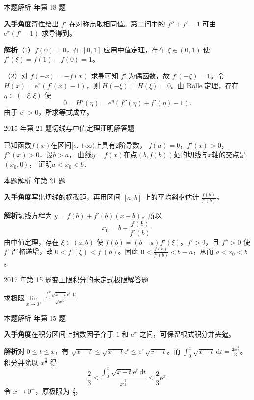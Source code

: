 \documentclass[UTF8,zihao=-4,fontset=fandol]{ctexart}
\renewcommand{\lim}{\operatorname*{lim}\limits}
\newcommand{\QuestionPage}[6]{%
  \par\noindent\begin{minipage}{\linewidth}
  \raggedright
  {\small\textcolor{black!60}{#3\quad #5}\hfill\textcolor{accent}{#2}}\par\smallskip}
\newcommand{\QuestionEnd}{\end{minipage}\par\medskip}
\newcommand{\QuestionPage}[6]{%
  \clearpage
  {\small\textcolor{accent}{#1\hfill #2}}\par\medskip
  {\small\textcolor{black!60}{#3\quad #5\hfill #6}}\par\vspace{9bp}}
\newcommand{\QuestionEnd}{}
\newenvironment{QuestionSolution}[1]{%
  \clearpage
  {\small\textcolor{black!60}{本题解析\quad #1}}\par\medskip
}{\par\clearpage}
\begin{document}
\begin{QuestionSolution}{2013 年第 18 题}
\textbf{入手角度}\quad 奇性给出 \(f'\) 在对称点取相同值。第二问中的 \(f''+f'-1\) 可由 \(\mathrm{e}^x(f'-1)\) 求导得到。

\textbf{解析}\quad （1）\(f(0)=0\)，在 \([0,1]\) 应用中值定理，存在 \(\xi\in(0,1)\) 使 \(f'(\xi)=f(1)-f(0)=1\)。

（2）对 \(f(-x)=-f(x)\) 求导可知 \(f'\) 为偶函数，故 \(f'(-\xi)=1\)。令 \(H(x)=\mathrm{e}^x(f'(x)-1)\)，则 \(H(-\xi)=H(\xi)=0\)。由 Rolle 定理，存在 \(\eta\in(-\xi,\xi)\) 使
\[
0=H'(\eta)=\mathrm{e}^\eta(f''(\eta)+f'(\eta)-1).
\]
由于 \(\mathrm{e}^\eta>0\)，所求等式成立。
\end{QuestionSolution}

\QuestionPage{2.4 微分中值定理及其应用}{解答题}{2015 年第 21 题}{4}{切线与中值定理证明}{090 / 234}
已知函数$f(x)$在区间$[a,+\infty)$上具有$2$阶导数，
$f(a) = 0$，$f'(x) > 0$，$f''(x) > 0$．设$b > a$，
曲线$y = f(x)$在点$(b,f(b))$处的切线与$x$轴的交点是$(x_0,0)$，
证明$a < x_0 < b$．
\QuestionEnd

\begin{QuestionSolution}{2015 年第 21 题}
\textbf{入手角度}\quad 写出切线的横截距，再用区间 \([a,b]\) 上的平均斜率估计 \(\frac{f(b)}{f'(b)}\)。

\textbf{解析}\quad 切线方程为 \(y=f(b)+f'(b)(x-b)\)，所以
\[
x_0=b-\frac{f(b)}{f'(b)}.
\]
由中值定理，存在 \(\xi\in(a,b)\) 使 \(f(b)=(b-a)f'(\xi)\)。\(f'>0\)，且 \(f''>0\) 使 \(f'\) 严格递增，故 \(0<f'(\xi)<f'(b)\)。因此 \(0<\frac{f(b)}{f'(b)}<b-a\)，从而 \(a<x_0<b\)。
\end{QuestionSolution}

\QuestionPage{2.4 微分中值定理及其应用}{解答题}{2017 年第 15 题}{2}{变上限积分的未定式极限}{091 / 234}
求极限$\lim_{x \to 0^+} \frac{\int_0^x \sqrt{x - t} \mathrm{e}^t \,\mathrm{d} t}{\sqrt{x^3}}$．
\QuestionEnd

\begin{QuestionSolution}{2017 年第 15 题}
\textbf{入手角度}\quad 在积分区间上指数因子介于 \(1\) 和 \(\mathrm{e}^x\) 之间，可保留根式积分并夹逼。

\textbf{解析}\quad 对 \(0\le t\le x\)，有
\(\sqrt{x-t}\le \sqrt{x-t}\mathrm{e}^t\le \mathrm{e}^x\sqrt{x-t}\)。而 \(\int_0^x\sqrt{x-t}\,\mathrm{d}t=\frac{2x^{\frac{3}{2}}}{3}\)。积分并除以 \(x^{\frac{3}{2}}\) 得
\[
\frac23\le\frac{\int_0^x\sqrt{x-t}\mathrm{e}^t\,\mathrm{d}t}{x^{\frac{3}{2}}}\le\frac23 \mathrm{e}^x.
\]
令 \(x\to0^+\)，原极限为 \(\boxed{\frac{2}{3}}\)。
\end{QuestionSolution}
\end{document}
